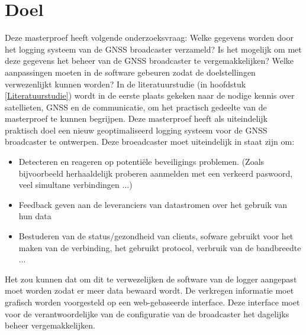 \section{Doel}
\label{SDoe}
Deze masterproef heeft volgende onderzoeksvraag: \newline
\MyIndentSit Welke gegevens worden door het logging systeem van de GNSS broadcaster verzameld? \newline
\MyIndentSit Is het mogelijk om met deze gegevens het beheer van de GNSS broadcaster te vergemakkelijken?\newline
\MyIndentSit Welke aanpassingen moeten in de software gebeuren zodat de doelstellingen verwezenlijkt kunnen worden? 
In de literatuurstudie (in hoofdstuk \ref{Literatuurstudie}) wordt in de eerste plaats gekeken naar de nodige kennis over satellieten, GNSS en de communicatie, om het practisch gedeelte van de masterproef te kunnen begrijpen.
\newline
Deze masterproef heeft als uiteindelijk praktisch doel een nieuw geoptimaliseerd logging systeem voor de GNSS broadcaster te ontwerpen. Deze broeadcaster moet uiteindelijk in staat zijn om:
\begin{itemize}
	\item Detecteren en reageren op potenti\"ele beveiligings problemen. (Zoals bijvoorbeeld herhaaldelijk proberen aanmelden met een verkeerd paswoord, veel simultane verbindingen ...)
	\item Feedback geven aan de leveranciers van datastromen over het gebruik van hun data
	\item Bestuderen van de status/gezondheid van clients, sofware gebruikt voor het maken van de verbinding, het gebruikt protocol, verbruik van de bandbreedte ...
\end{itemize}
Het zou kunnen dat om dit te verwezelijken de software van de logger aangepast moet worden zodat er meer data bewaard wordt. De verkregen informatie moet grafisch worden voorgesteld op een web-gebaseerde interface.  Deze interface moet voor de verantwoordelijke van de configuratie van de broadcaster het dagelijks beheer vergemakkelijken. 